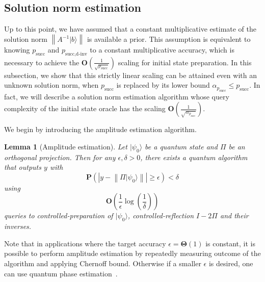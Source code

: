 \documentclass[letterpaper,onecolumn,11pt,accepted=2026-02-14]{quantumarticle}
\newcommand{\abs}[1]{\left\lvert#1\right\rvert}
\newcommand{\norm}[1]{\left\lVert#1\right\rVert}
\newtheorem{lemma}{Lemma}
\theoremstyle{remark}
\theoremstyle{plain}
\newcommand{\ket}[1]{|#1\rangle}
\begin{document}
\subsection{Solution norm estimation}
\label{sec:dinv_est}
Up to this point, we have assumed that a constant multiplicative estimate of the solution norm $\norm{A^{-1}\ket{b}}$ is available a prior. This assumption is equivalent to knowing $p_{\text{succ}}$ and $p_{\text{succ,d-inv}}$ to a constant multiplicative accuracy, which is necessary to achieve the $\mathbf{O}\left(\frac{1}{\sqrt{p_{\text{succ}}}}\right)$ scaling for initial state preparation. In this subsection, we show that this strictly linear scaling can be attained even with an unknown solution norm, when $p_{\text{succ}}$ is replaced by its lower bound $\alpha_{p_{\text{succ}}}\leq p_{\text{succ}}$. In fact, we will describe a solution norm estimation algorithm whose query complexity of the initial state oracle has the scaling $\mathbf{O}\left(\frac{1}{\sqrt{\alpha_{p_{\text{succ}}}}}\right)$.

We begin by introducing the amplitude estimation algorithm.
\begin{lemma}[Amplitude estimation]
Let $\ket{\psi_0}$ be a quantum state and $\Pi$ be an orthogonal projection. Then for any $\epsilon,\delta>0$, there exists a quantum algorithm that outputs $y$ with
\begin{equation}
    \mathbf{P}\left(\abs{y-\norm{\Pi \ket{\psi_0}}}\geq\epsilon\right)<\delta
\end{equation}
using
\begin{equation}
    \mathbf{O}\left(\frac{1}{\epsilon}\log\left(\frac{1}{\delta}\right)\right)
\end{equation}
queries to controlled-preparation of $\ket{\psi_0}$, controlled-reflection $I-2\Pi$ and their inverses.
\end{lemma}
\noindent Note that in applications where the target accuracy $\epsilon=\mathbf{\Theta}(1)$ is constant, it is possible to perform amplitude estimation by repeatedly measuring outcome of the algorithm and applying Chernoff bound. Otherwise if a smaller $\epsilon$ is desired, one can use quantum phase estimation~\cite{brassard2002quantum}.
\end{document}
